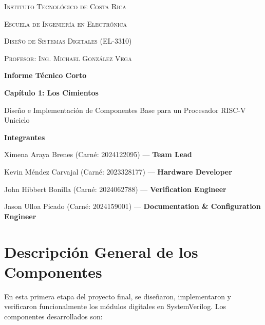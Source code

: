 \documentclass[12pt,a4paper]{article}
\begin{document}
\begin{titlepage}
    \centering
    {\scshape\LARGE Instituto Tecnológico de Costa Rica \par}
    \vspace{0.8cm}
    {\scshape\Large Escuela de Ingeniería en Electrónica \par}
    \vspace{0.8cm}
    {\scshape\Large Diseño de Sistemas Digitales (EL-3310) \par}
    \vspace{0.8cm}
    {\scshape\LARGE Profesor: Ing. Michael González Vega \par}
    \vspace{1.5cm}
    {\huge\bfseries Informe Técnico Corto \par}
    \vspace{0.4cm}
    {\Large\bfseries Capítulo 1: Los Cimientos \par}
    \vspace{0.6cm}
    {\large Diseño e Implementación de Componentes Base para un Procesador RISC-V Uniciclo \par}
    \vspace{1.5cm}
    
    {\Large \textbf{Integrantes}} \\
    \vspace{0.5cm}
    {\large Ximena Araya Brenes (Carné: 2024122095) --- \textbf{Team Lead} \par}
    \vspace{0.2cm}
    {\large Kevin Méndez Carvajal (Carné: 2023328177) --- \textbf{Hardware Developer} \par}
    \vspace{0.2cm}
    {\large John Hibbert Bonilla (Carné: 2024062788) --- \textbf{Verification Engineer} \par}
    \vspace{0.2cm}
    {\large Jason Ulloa Picado (Carné: 2024159001) --- \textbf{Documentation \& Configuration Engineer} \par}

\end{titlepage}

\newpage

\section{Descripción General de los Componentes}
En esta primera etapa del proyecto final, se diseñaron, implementaron y verificaron funcionalmente los módulos digitales en SystemVerilog. Los componentes desarrollados son:
\end{document}
